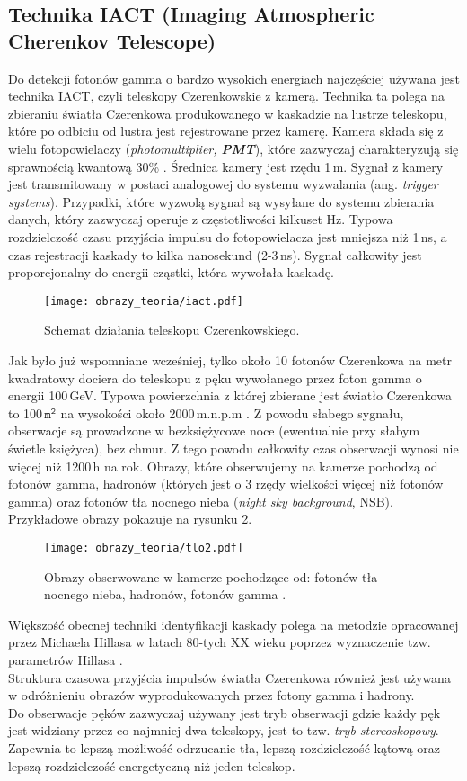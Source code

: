 \documentclass[a4paper,11pt,twoside]{article}
\begin{document}
\subsection{Technika IACT (Imaging Atmospheric Cherenkov Telescope)}
Do detekcji fotonów gamma o bardzo wysokich energiach najczęściej używana jest technika IACT, czyli teleskopy Czerenkowskie z kamerą. Technika ta polega na zbieraniu światła Czerenkowa produkowanego w kaskadzie na lustrze teleskopu, które po odbiciu od lustra jest rejestrowane przez kamerę. Kamera składa się z wielu fotopowielaczy (\textsl{photomultiplier, {\bf{PMT}}}), które zazwyczaj charakteryzują się sprawnością kwantową 30\% \cite{particle_de_angelis}. Średnica kamery jest rzędu 1\,m. Sygnał z kamery jest transmitowany w postaci analogowej do systemu wyzwalania (ang. \textsl{trigger systems}). Przypadki, które wyzwolą sygnał są wysyłane do systemu zbierania danych, który zazwyczaj operuje z częstotliwości kilkuset Hz. Typowa rozdzielczość czasu przyjścia impulsu do fotopowielacza jest mniejsza niż 1\,ns, a czas rejestracji kaskady to kilka nanosekund (2-3\,ns). Sygnał całkowity jest proporcjonalny do energii cząstki, która wywołała kaskadę.
\begin{figure}[H] 
\centering
\texttt{[image: obrazy\_teoria/iact.pdf]}
\caption{Schemat działania teleskopu Czerenkowskiego.}
\label{fig:kamera}
\end{figure}
Jak było już wspomniane wcześniej, tylko około 10 fotonów Czerenkowa na metr kwadratowy dociera do teleskopu z pęku wywołanego przez foton gamma o energii 100\,GeV. Typowa powierzchnia z której zbierane jest światło Czerenkowa to 100\,$\mathtt{m^2}$ na wysokości około 2000\,m.n.p.m \cite{particle_de_angelis}. Z powodu słabego sygnału, obserwacje są prowadzone w bezksiężycowe noce (ewentualnie przy słabym świetle księżyca), bez chmur. Z tego powodu całkowity czas obserwacji wynosi nie więcej niż 1200\,h na rok.
Obrazy, które obserwujemy na kamerze pochodzą od fotonów gamma, hadronów (których jest o 3 rzędy wielkości więcej niż fotonów gamma) oraz fotonów tła nocnego nieba (\textsl{night sky background}, NSB). Przykładowe obrazy pokazuje na rysunku
 \ref{fig:kamera}.
\begin{figure}[H] 
\centering
\texttt{[image: obrazy\_teoria/tlo2.pdf]}
\caption{Obrazy obserwowane w kamerze pochodzące od: fotonów tła nocnego nieba, hadronów, fotonów gamma \cite{cta_de_angelis}. }
\label{fig:kamera}
\end{figure}
Większość obecnej techniki identyfikacji kaskady polega na metodzie opracowanej przez Michaela Hillasa w latach 80-tych XX wieku poprzez wyznaczenie tzw. parametrów Hillasa \cite{hilas}. \\
Struktura czasowa przyjścia impulsów światła Czerenkowa również jest używana w odróżnieniu obrazów wyprodukowanych przez fotony gamma i hadrony. \\
Do obserwacje pęków zazwyczaj używany jest tryb obserwacji gdzie każdy pęk jest widziany przez co najmniej dwa teleskopy, jest to tzw. \textsl{tryb stereoskopowy}. Zapewnia to lepszą możliwość odrzucanie tła, lepszą rozdzielczość kątową oraz lepszą rozdzielczość energetyczną niż jeden teleskop.
\end{document}
